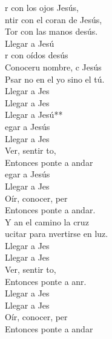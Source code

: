 \documentclass[12pt]{article}
\begin{document}
\begin{multicols*}{2}
\begin{cancion}%
	r con los ojos Jesús,\\
	ntir con el coran de Jesús,\\
	Tor con las manos desús.\\
	Llegar a Jesú   \\
	r con oídos desús \\
	Conoceru nombre, c Jesús\\
	Psar no en el yo sino el tú.\\
	Llegar a Jes \\
	Llegar a Jes\\
	Llegar a Jesú**\\
	egar a Jesús\\
	Llegar a Jes\\
	Ver, sentir to,    \\
	Entonces ponte a andar\\
	egar a Jesús\\
	Llegar a Jes\\
	Oír, conocer, per   \\
	Entonces ponte a andar.\\
	Y an el camino  la cruz\\
	ucitar para nvertirse en luz.\\
	Llegar a Jes \\
	Llegar a Jes\\
	Ver, sentir to,    \\
	Entonces ponte a anr.\\
	Llegar a Jes \\
	Llegar a Jes\\
	Oír, conocer, per   \\
	Entonces ponte a andar\\
\end{cancion}%


\end{multicols*}
\end{document}

